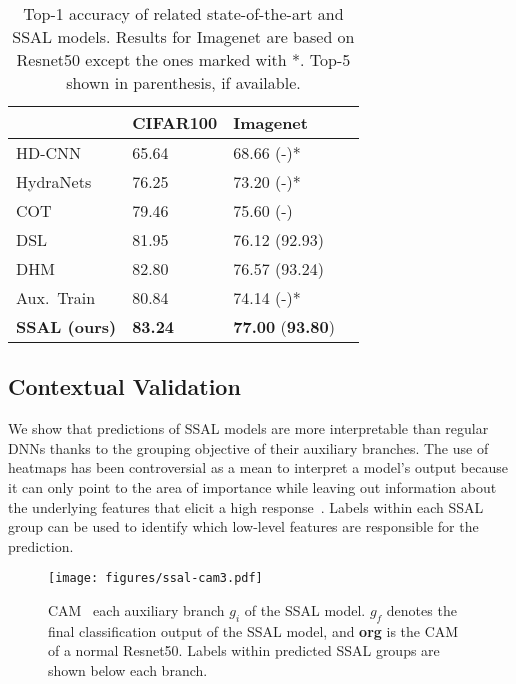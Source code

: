 \documentclass[10pt,twocolumn,letterpaper]{article}
\begin{document}
\begin{table}[t]
\centering
\begin{tabulary}{\textwidth}{@{}p{85pt}p{55pt}p{55pt}p{55pt}@{}}
\toprule
                                        & CIFAR100        & Imagenet                                   \\
\midrule
HD-CNN~\cite{yan2015hd}                 & 65.64           & 68.66 (-)*                                 \\
HydraNets~\cite{mullapudi2018hydranets} & 76.25           & 73.20 (-)*                                 \\
COT~\cite{chen2018complement}           & 79.46           & 75.60 (-)                                  \\
DSL~\cite{lee2015deeply,li2020dynamic}  & 81.95           & 76.12 (92.93)                              \\
DHM~\cite{li2020dynamic}                & 82.80           & 76.57 (93.24)                              \\
Aux.~Train~\cite{zhang2020auxiliary}    & 80.84           & 74.14 (-)*                                 \\
\textbf{SSAL (ours)}                    & \textbf{83.24}  & \textbf{77.00}  (\textbf{93.80})   \\
\bottomrule
\end{tabulary}
\caption{Top-1 accuracy of related state-of-the-art and SSAL models. Results for Imagenet are based on Resnet50 except the ones marked with *. Top-5 shown in parenthesis, if available.}
\label{tab:sota}
\end{table}


\subsection{Contextual Validation}
We show that predictions of SSAL models are more interpretable than regular DNNs thanks to the grouping objective of their auxiliary branches.
The use of heatmaps has been controversial as a mean to interpret a model's output because it can only point to the area of importance while leaving out information about the underlying features that elicit a high response~\cite{rudin2019stop}.
Labels within each SSAL group can be used to identify which low-level features are responsible for the prediction.


\begin{figure}[t]
\centering
    \texttt{[image: figures/ssal-cam3.pdf]}
	\caption{CAM \wrt~each auxiliary branch $g_i$ of the SSAL model. $g_f$ denotes the final classification output of the SSAL model, and \textbf{org} is the CAM of a normal Resnet50. Labels within predicted SSAL groups are shown below each branch.}
	\label{fig:ssal-cam}
\end{figure}
\end{document}
